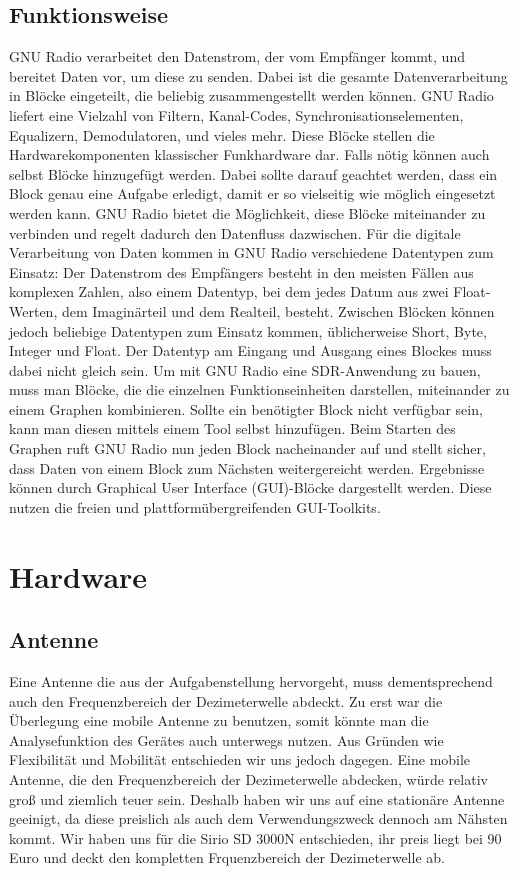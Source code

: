 \subsection{Funktionsweise}
GNU Radio verarbeitet den Datenstrom, der vom Empfänger kommt, und bereitet Daten vor, um diese zu senden. Dabei ist die gesamte Datenverarbeitung in Blöcke eingeteilt,  die  beliebig  zusammengestellt  werden können. GNU Radio liefert eine Vielzahl von Filtern, Kanal-Codes, Synchronisationselementen, Equalizern, Demodulatoren, und vieles mehr. Diese  Blöcke  stellen  die  Hardwarekomponenten  klassischer  Funkhardware  dar. Falls nötig können auch selbst Blöcke hinzugefügt werden. Dabei sollte darauf geachtet werden, dass ein Block genau eine Aufgabe erledigt, damit er so vielseitig wie möglich eingesetzt werden kann. GNU Radio bietet die Möglichkeit, diese Blöcke miteinander zu verbinden und regelt dadurch den Datenfluss dazwischen. Für die digitale Verarbeitung von Daten kommen in GNU Radio verschiedene Datentypen zum Einsatz: Der Datenstrom des Empfängers besteht in den meisten Fällen aus komplexen Zahlen, also einem Datentyp, bei dem jedes Datum aus zwei Float-Werten, dem Imaginärteil und dem Realteil, besteht. Zwischen Blöcken können jedoch beliebige Datentypen zum Einsatz kommen, üblicherweise Short, Byte, Integer und Float. Der Datentyp am Eingang und Ausgang eines Blockes muss dabei nicht gleich sein.
Um mit GNU Radio eine SDR-Anwendung zu bauen, muss man Blöcke, die die einzelnen Funktionseinheiten darstellen, miteinander zu einem Graphen kombinieren. Sollte ein benötigter Block nicht verfügbar sein, kann man diesen mittels einem Tool selbst hinzufügen. Beim Starten des Graphen ruft GNU Radio nun jeden Block nacheinander auf und stellt sicher, dass Daten von einem Block zum Nächsten weitergereicht werden. Ergebnisse  können  durch  Graphical  User  Interface  (GUI)-Blöcke dargestellt werden. Diese nutzen die freien und plattformübergreifenden GUI-Toolkits.
\section{Hardware}
\subsection{Antenne}
Eine Antenne die aus der Aufgabenstellung hervorgeht, muss dementsprechend auch den Frequenzbereich der Dezimeterwelle abdeckt. Zu erst war die Überlegung eine mobile Antenne zu benutzen, somit könnte man die Analysefunktion des Gerätes auch unterwegs nutzen. Aus Gründen wie Flexibilität und Mobilität entschieden wir uns jedoch dagegen. Eine mobile Antenne, die den Frequenzbereich der Dezimeterwelle abdecken, würde relativ groß und ziemlich teuer sein. Deshalb haben wir uns auf eine stationäre Antenne geeinigt, da diese preislich als auch dem Verwendungszweck dennoch am Nähsten kommt. Wir haben uns für die  Sirio SD 3000N entschieden, ihr preis liegt bei 90 Euro und deckt den kompletten Frquenzbereich der Dezimeterwelle ab.\newline

